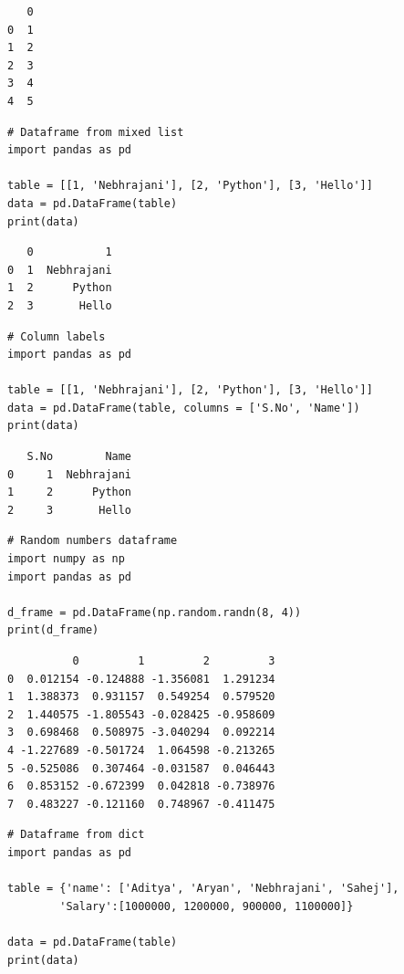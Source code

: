 \documentclass[11pt]{article}
\begin{document}
\begin{verbatim}
   0
0  1
1  2
2  3
3  4
4  5
\end{verbatim}


\begin{verbatim}
# Dataframe from mixed list
import pandas as pd

table = [[1, 'Nebhrajani'], [2, 'Python'], [3, 'Hello']]
data = pd.DataFrame(table)
print(data)
\end{verbatim}

\begin{verbatim}
   0           1
0  1  Nebhrajani
1  2      Python
2  3       Hello
\end{verbatim}


\begin{verbatim}
# Column labels
import pandas as pd

table = [[1, 'Nebhrajani'], [2, 'Python'], [3, 'Hello']]
data = pd.DataFrame(table, columns = ['S.No', 'Name'])
print(data)
\end{verbatim}

\begin{verbatim}
   S.No        Name
0     1  Nebhrajani
1     2      Python
2     3       Hello
\end{verbatim}


\begin{verbatim}
# Random numbers dataframe
import numpy as np
import pandas as pd

d_frame = pd.DataFrame(np.random.randn(8, 4))
print(d_frame)
\end{verbatim}

\begin{verbatim}
          0         1         2         3
0  0.012154 -0.124888 -1.356081  1.291234
1  1.388373  0.931157  0.549254  0.579520
2  1.440575 -1.805543 -0.028425 -0.958609
3  0.698468  0.508975 -3.040294  0.092214
4 -1.227689 -0.501724  1.064598 -0.213265
5 -0.525086  0.307464 -0.031587  0.046443
6  0.853152 -0.672399  0.042818 -0.738976
7  0.483227 -0.121160  0.748967 -0.411475
\end{verbatim}


\begin{verbatim}
# Dataframe from dict
import pandas as pd

table = {'name': ['Aditya', 'Aryan', 'Nebhrajani', 'Sahej'],
        'Salary':[1000000, 1200000, 900000, 1100000]}

data = pd.DataFrame(table)
print(data)
\end{verbatim}
\end{document}
